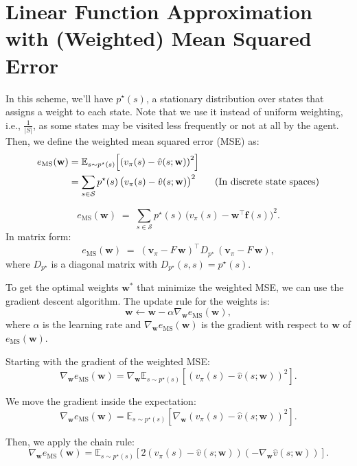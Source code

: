 \section{Linear Function Approximation with (Weighted) Mean Squared Error}

In this scheme, we'll have \(p^\star(s)\), a stationary distribution over states that assigns a weight to each state. Note that we use it instead of uniform weighting, i.e., \(\frac{1}{|S|}\), as some states may be visited less frequently or not at all by the agent. Then, we define the weighted mean squared error (MSE) as:
\begin{align}
    e_{\text{MS}}(\mathbf{w}) 
    &= \mathbb{E}_{s \sim p^\star(s)}\left[\left(v_\pi(s) - \hat{v}(s;\mathbf{w})\right)^2\right] \notag \\
    &= \sum_{s \in \mathcal{S}} p^\star(s)\,\bigl(v_\pi(s) - \hat{v}(s;\mathbf{w})\bigr)^2 
    \tag*{\text{(In discrete state spaces)}}
\end{align}

\[
e_{\text{MS}}(\mathbf{w})
\;=\; \sum_{s \in \mathcal{S}} p^\star(s)\,\bigl(v_\pi(s) - \mathbf{w}^\top \mathbf{f}(s)\bigr)^2.
\]
In matrix form:
\[
e_{\text{MS}}(\mathbf{w}) 
\;=\; (\mathbf{v}_\pi - F\,\mathbf{w})^\top D_{p^\star} \,(\mathbf{v}_\pi - F\,\mathbf{w}),
\]
where \(D_{p^\star}\) is a diagonal matrix with \(D_{p^\star}(s,s) = p^\star(s)\). 

To get the optimal weights \(\mathbf{w}^*\) that minimize the weighted MSE, we can use the gradient descent algorithm. The update rule for the weights is:
\[
\mathbf{w} \leftarrow \mathbf{w} - \alpha \nabla_{\mathbf{w}} e_{\text{MS}}(\mathbf{w}),
\]
where \(\alpha\) is the learning rate and \(\nabla_{\mathbf{w}} e_{\text{MS}}(\mathbf{w})\) is the gradient with respect to \(\mathbf{w}\) of \(e_{\text{MS}}(\mathbf{w})\).

Starting with the gradient of the weighted MSE:
\[
\nabla_{\mathbf{w}} e_{\text{MS}}(\mathbf{w}) = \nabla_{\mathbf{w}} \mathbb{E}_{s \sim p^\star(s)}\left[\left(v_\pi(s) - \hat{v}(s;\mathbf{w})\right)^2\right].
\]

We move the gradient inside the expectation:
\[
\nabla_{\mathbf{w}} e_{\text{MS}}(\mathbf{w}) = \mathbb{E}_{s \sim p^\star(s)}\left[\nabla_{\mathbf{w}} \left(v_\pi(s) - \hat{v}(s;\mathbf{w})\right)^2\right].
\]

Then, we apply the chain rule:
\[
\nabla_{\mathbf{w}} e_{\text{MS}}(\mathbf{w}) = \mathbb{E}_{s \sim p^\star(s)}\left[2 \left(v_\pi(s) - \hat{v}(s;\mathbf{w})\right) \left(- \nabla_{\mathbf{w}} \hat{v}(s;\mathbf{w})\right)\right].
\]

